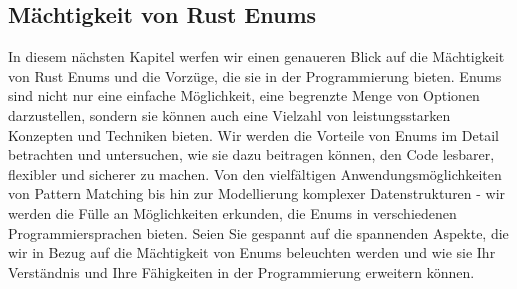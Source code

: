 \documentclass[a4paper, 1ppt]{article}
\begin{document}
\subsection{Mächtigkeit von Rust Enums}
In diesem nächsten Kapitel werfen wir einen genaueren Blick auf die Mächtigkeit von Rust Enums und die Vorzüge, die sie in der Programmierung bieten. Enums sind nicht nur eine einfache Möglichkeit, eine begrenzte Menge von Optionen darzustellen, sondern sie können auch eine Vielzahl von leistungsstarken Konzepten und Techniken bieten. Wir werden die Vorteile von Enums im Detail betrachten und untersuchen, wie sie dazu beitragen können, den Code lesbarer, flexibler und sicherer zu machen. Von den vielfältigen Anwendungsmöglichkeiten von Pattern Matching bis hin zur Modellierung komplexer Datenstrukturen - wir werden die Fülle an Möglichkeiten erkunden, die Enums in verschiedenen Programmiersprachen bieten. Seien Sie gespannt auf die spannenden Aspekte, die wir in Bezug auf die Mächtigkeit von Enums beleuchten werden und wie sie Ihr Verständnis und Ihre Fähigkeiten in der Programmierung erweitern können.
\end{document}
